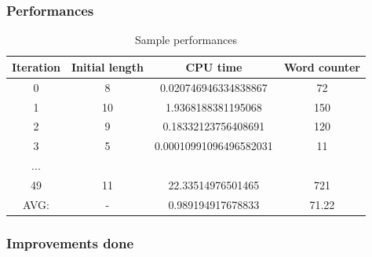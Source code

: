 \documentclass[10pt,a4paper,hidelinks]{article}
\begin{document}
\subsubsection{Performances}
\begin{table}[!ht]
    \centering
    \begin{tabular}{|c|c|c|c|}
        \hline
        Iteration & Initial length & CPU time & Word counter \\ \hline
        0 & 8 & 0.020746946334838867 & 72 \\ 
        1 & 10 & 1.9368188381195068 & 150 \\ 
        2 & 9 & 0.18332123756408691 & 120 \\ 
        3 & 5 & 0.00010991096496582031 & 11 \\ 
        ... & ~ & ~ & ~ \\ 
        49 & 11 & 22.33514976501465 & 721 \\ 
        \hline
        \hline
        AVG: & - & 0.989194917678833 & 71.22 \\ 
        \hline
    \end{tabular}
    \caption{Sample performances}
\end{table}

\subsubsection{Improvements done}
\end{document}
